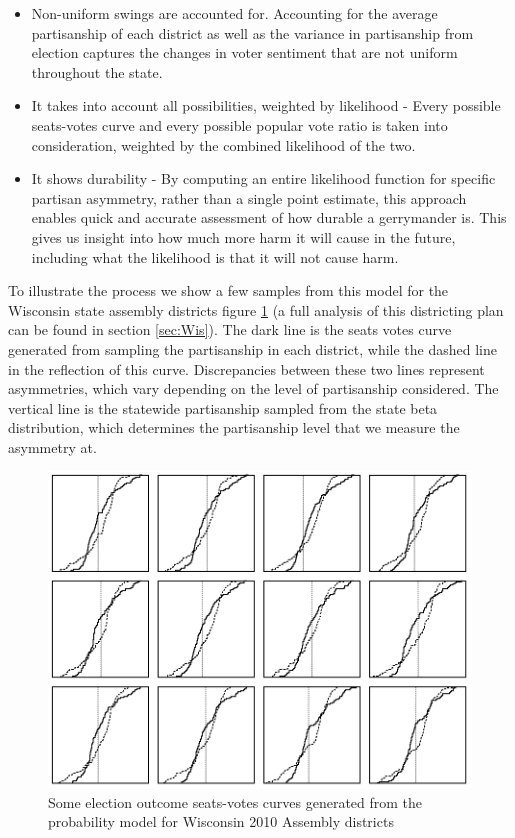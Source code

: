 \documentclass[preprint,12pt]{article}
\begin{document}
\begin{itemize}

\item Non-uniform swings are accounted for. Accounting for the average partisanship of each district as well as the variance in partisanship from election captures the changes in voter sentiment that are not uniform throughout the state.

\item It takes into account all possibilities, weighted by likelihood - Every possible seats-votes curve and every possible popular vote ratio is taken into consideration, weighted by the combined likelihood of the two.

\item It shows durability - By computing an entire likelihood function for specific partisan asymmetry, rather than a single point estimate, this approach enables quick and accurate assessment of how durable a gerrymander is. This gives us insight into how much more harm it will cause in the future, including what the likelihood is that it will not cause harm.

\end{itemize}

To illustrate the process we show a few samples from this model for the Wisconsin state assembly districts figure \ref{fig:SVAssembly2010} (a full analysis of this districting plan can be found in section \ref{sec:Wis}).
The dark line is the seats votes curve generated from sampling the partisanship in each district, while the dashed line in the reflection of this curve.
Discrepancies between these two lines represent asymmetries, which vary depending on the level of partisanship considered.
The vertical line is the statewide partisanship sampled from the state beta distribution, which determines the partisanship level that we measure the asymmetry at.

\begin{figure}[htb!]
    \begin{center}
        \includegraphics[scale=0.45]{../Figures/WI2010/sv_curves_assembly.png}
        \caption{Some election outcome seats-votes curves generated from the probability model for Wisconsin 2010 Assembly districts}\label{fig:SVAssembly2010}
    \end{center}
\end{figure}
\end{document}
